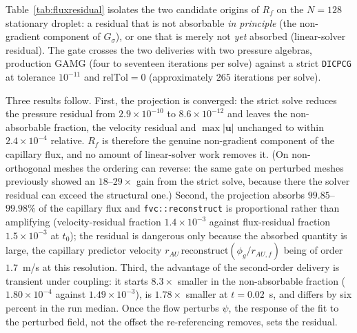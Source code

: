 \documentclass[preprint,3p,11pt]{elsarticle}
\newcommand{\psilev}{\psi}                       %
\newcommand{\uvec}{\mathbf{u}}
\begin{document}
Table~\ref{tab:fluxresidual} isolates the two candidate origins of $R_f$ on the $N=128$
stationary droplet: a residual that is not absorbable \emph{in principle} (the non-gradient
component of $G_\sigma$), or one that is merely not \emph{yet} absorbed (linear-solver residual).
The gate crosses the two deliveries with two pressure algebras, production GAMG (four to
seventeen iterations per solve) against a strict \texttt{DICPCG} at tolerance $10^{-11}$ and
$\mathrm{relTol}=0$ (approximately $265$ iterations per solve).
\begin{table}[t]
  \centering
  \caption{Capillary flux residual on the active $\mathrm{snGrad}(\alpha)$ faces, $N=128$
  stationary droplet to $t=0.02$~s. $R_f/G_\sigma$ is
  $\max\lvert R_f\rvert / \max\lvert\phi_g\rvert$ over those faces;
  $\uvec_{\mathrm{res}} = r_{AU}\,\mathrm{reconstruct}(R_f/r_{AU,f})$ is the velocity the residual
  produces. Tightening the pressure solve by a factor $30$ in final residual changes every entry
  by at most $2.4\times10^{-4}$ relative over the whole run.}
  \label{tab:fluxresidual}
  
\end{table}

Three results follow. First, the projection is converged: the strict solve reduces the pressure
residual from $2.9\times10^{-10}$ to $8.6\times10^{-12}$ and leaves the non-absorbable fraction,
the velocity residual and $\max\lvert\uvec\rvert$ unchanged to within $2.4\times10^{-4}$
relative. $R_f$ is therefore the genuine non-gradient component of the capillary flux, and no
amount of linear-solver work removes it. (On non-orthogonal meshes the ordering can reverse: the
same gate on perturbed meshes previously showed an $18$--$29\times$ gain from the strict solve,
because there the solver residual can exceed the structural one.) Second, the projection absorbs
$99.85$--$99.98\%$ of the capillary flux and \texttt{fvc::reconstruct} is proportional rather
than amplifying (velocity-residual fraction $1.4\times10^{-3}$ against flux-residual fraction
$1.5\times10^{-3}$ at $t_0$); the residual is dangerous only because the absorbed quantity is
large, the capillary predictor velocity $r_{AU}\,\mathrm{reconstruct}(\phi_g/r_{AU,f})$ being of
order $1.7$~m/s at this resolution. Third, the advantage of the second-order delivery is
transient under coupling: it starts $8.3\times$ smaller in the non-absorbable fraction
($1.80\times10^{-4}$ against $1.49\times10^{-3}$), is $1.78\times$ smaller at $t=0.02$~s, and
differs by six percent in the run median. Once the flow perturbs $\psilev$, the response of the
fit to the perturbed field, not the offset the re-referencing removes, sets the residual.
\end{document}
